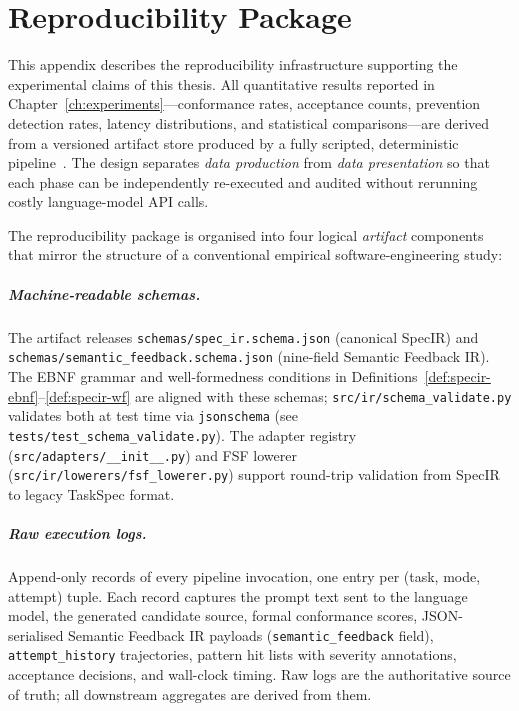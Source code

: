 \chapter{Reproducibility Package}
\label{app:reproducibility}

This appendix describes the reproducibility infrastructure supporting the
experimental claims of this thesis.  All quantitative results reported in
Chapter~\ref{ch:experiments}---conformance rates, acceptance counts, prevention
detection rates, latency distributions, and statistical comparisons---are
derived from a versioned artifact store produced by a fully scripted,
deterministic pipeline~\citep{ammann2016testing,woodcock2009formalsurvey}.  The design separates \emph{data production} from
\emph{data presentation} so that each phase can be independently re-executed
and audited without rerunning costly language-model API calls.

The reproducibility package is organised into four logical \emph{artifact}
components that mirror the structure of a conventional empirical
software-engineering study:

\paragraph{Machine-readable schemas.}
\label{sec:repro:schemas}
The artifact releases \texttt{schemas/spec\_ir.schema.json} (canonical SpecIR)
and \texttt{schemas/semantic\_feedback.schema.json} (nine-field Semantic
Feedback IR).
The EBNF grammar and well-formedness conditions in
Definitions~\ref{def:specir-ebnf}--\ref{def:specir-wf} are aligned with these
schemas; \texttt{src/ir/schema\_validate.py} validates both at test time via
\texttt{jsonschema} (see \texttt{tests/test\_schema\_validate.py}).
The adapter registry (\texttt{src/adapters/\_\_init\_\_.py}) and
FSF lowerer (\texttt{src/ir/lowerers/fsf\_lowerer.py}) support round-trip
validation from SpecIR to legacy TaskSpec format.

\paragraph{Raw execution logs.}
Append-only records of every pipeline invocation, one entry per
(task, mode, attempt) tuple.  Each record captures the prompt text
sent to the language model, the generated candidate source, formal
conformance scores, JSON-serialised Semantic Feedback IR payloads
(\texttt{semantic\_feedback} field), \texttt{attempt\_history} trajectories,
pattern hit lists with severity annotations, acceptance decisions, and
wall-clock timing.
Raw logs are the authoritative source of truth; all downstream
aggregates are derived from them.


